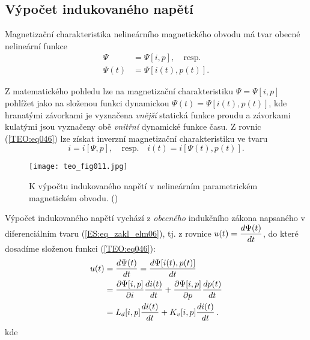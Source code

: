 {    \subsection{Výpočet indukovaného napětí}
      Magnetizační charakteristika nelineárního magnetického obvodu má tvar obecné nelineární funkce
      \begin{align}\label{TEO:eq046}
        \Psi    &= \Psi[i,p], \quad\text{resp.}   \nonumber \\
        \Psi(t) &= \Psi[i(t), p(t)].
      \end{align}
    
      Z matematického pohledu lze na magnetizační charakteristiku \(\Psi = \Psi[i,p]\) pohlížet 
      jako na složenou funkci dynamickou \(\Psi(t) = \Psi[i(t),p(t)]\), kde hranatými závorkami je 
      vyznačena \emph{vnější} statická funkce proudu a závorkami kulatými jsou vyznačeny obě 
      \emph{vnitřní} dynamické funkce času. Z rovnic (\ref{TEO:eq046}) lze získat inverzní 
      magnetizační charakteristiku ve tvaru
      \begin{equation}\label{TEO:eq047}
        i = i[\Psi, p], \quad\text{resp.}\quad i(t) = i[\Psi(t), p(t)].
      \end{equation}

      \begin{figure}[ht!]  %
        \centering
        \texttt{[image: teo\_fig011.jpg]}
        \caption{K výpočtu indukovaného napětí v nelineárním parametrickém magnetickém obvodu. 
                (\cite[s.~161]{Patocka4})}
        \label{teo:fig011}
      \end{figure}
      
      Výpočet indukovaného napětí vychází z \emph{obecného} indukčního zákona napsaného v 
      diferenciálním tvaru (\ref{ES:eq_zakl_elm06}), tj. z rovnice \(u(t) = \dfrac{d \Psi(t)}{d t}\), do 
      které dosadíme složenou funkci (\ref{TEO:eq046}):
      \begin{align}
        u(t) &= \dfrac{d \Psi(t)}{d t} = \dfrac{d \Psi[i(t),p(t)]}{d t}                   \nonumber \\
             &= \dfrac{\partial \Psi[i, p]}{\partial i}\dfrac{d i(t)}{d t} 
              + \dfrac{\partial \Psi[i, p]}{\partial p}\dfrac{d p(t)}{d t}                             \nonumber \\
             &= L_d[i,p]\dfrac{d i(t)}{d t} 
              + K_v[i,p]\dfrac{d i(t)}{d t}\,.                                      \label{TEO:eq048}
      \end{align}
      kde 
           
}
